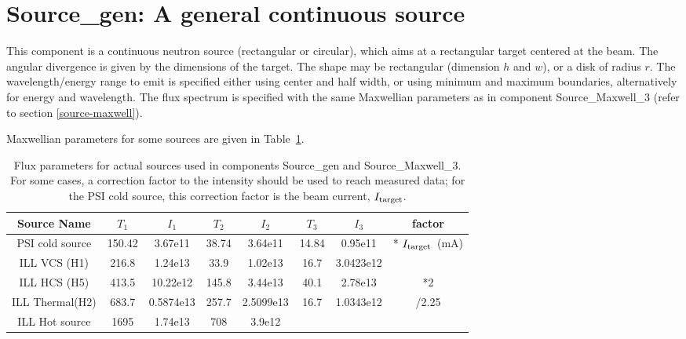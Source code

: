 \section{Source\_gen: A general continuous source}
\label{source-gen}


This component is a continuous neutron source (rectangular or circular), which aims at
a rectangular target centered at the beam. 
The angular divergence is given by the dimensions of the target. 
The shape may be rectangular (dimension $h$ and $w$), or a disk of radius $r$. 
The wavelength/energy range to emit is specified either using center and half width, or using minimum and maximum boundaries, alternatively for energy and wavelength.
The flux spectrum is specified with the same Maxwellian parameters as in component Source\_Maxwell\_3 (refer to section \ref{source-maxwell}).

Maxwellian parameters for some sources are given in Table~\ref{t:source-params}. 

\begin{table}
  \begin{center}
  {\let\my=\\
    \begin{tabular}{|c|cccccc|c|}
    \hline
    Source Name & $T_1$ & $I_1$ & $T_2$ & $I_2$ & $T_3$ & $I_3$ & factor \\
    \hline
    PSI cold source & 150.42 & 3.67e11   & 38.74 & 3.64e11    & 14.84& 0.95e11    & * $I_{\rm target}$~(mA)\\
    ILL VCS (H1)    & 216.8  & 1.24e13   & 33.9  & 1.02e13    & 16.7 & 3.0423e12  &\\
    ILL HCS (H5)    & 413.5  & 10.22e12  & 145.8 & 3.44e13    & 40.1 & 2.78e13    & *2\\
    ILL Thermal(H2) & 683.7  & 0.5874e13 & 257.7 & 2.5099e13  & 16.7 & 1.0343e12  & /2.25\\
    ILL Hot source  & 1695   & 1.74e13   & 708   & 3.9e12     &      &            &\\ \hline
    \end{tabular}
    \caption{Flux parameters for actual sources used in components
             Source\_gen and Source\_Maxwell\_3.
             For some cases, a correction factor to the intensity 
             should be used to reach measured data; for the PSI cold source,
             this correction factor is the beam current, $I_{\rm target}$.
}
    \label{t:source-params}
  }
  \end{center}
\end{table}